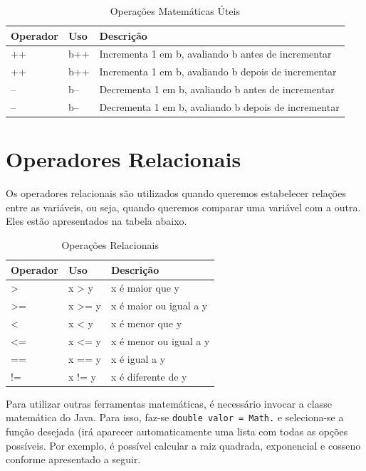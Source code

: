 \documentclass[
]{book}
\begin{document}
\begin{table}

\caption{\label{tab:unnamed-chunk-5}Operações Matemáticas Úteis}
\centering
\begin{tabular}[t]{l|l|l}
\hline
Operador & Uso & Descrição\\
\hline
++ & b++ & Incrementa 1 em b, avaliando b antes de incrementar\\
\hline
++ & b++ & Incrementa 1 em b, avaliando b depois de incrementar\\
\hline
-- & b-- & Decrementa 1 em b, avaliando b antes de incrementar\\
\hline
-- & b-- & Decrementa 1 em b, avaliando b depois de incrementar\\
\hline
\end{tabular}
\end{table}

\hypertarget{operadores-relacionais}{%
\section{Operadores Relacionais}\label{operadores-relacionais}}

Os operadores relacionais são utilizados quando queremos estabelecer relações entre as variáveis, ou seja, quando queremos comparar uma variável com a outra. Eles estão apresentados na tabela abaixo.

\begin{table}

\caption{\label{tab:unnamed-chunk-6}Operações Relacionais}
\centering
\begin{tabular}[t]{l|l|l}
\hline
Operador & Uso & Descrição\\
\hline
> & x > y & x é maior que y\\
\hline
>= & x >= y & x é maior ou igual a y\\
\hline
< & x < y & x é menor que y\\
\hline
<= & x <= y & x é menor ou igual a y\\
\hline
== & x == y & x é igual a y\\
\hline
!= & x != y & x é diferente de y\\
\hline
\end{tabular}
\end{table}

Para utilizar outras ferramentas matemáticas, é necessário invocar a classe matemática do Java. Para isso, faz-se \texttt{double\ valor\ =\ Math.} e seleciona-se a função desejada (irá aparecer automaticamente uma lista com todas as opções possíveis. Por exemplo, é possível calcular a raiz quadrada, exponencial e cosseno conforme apresentado a seguir.
\end{document}
